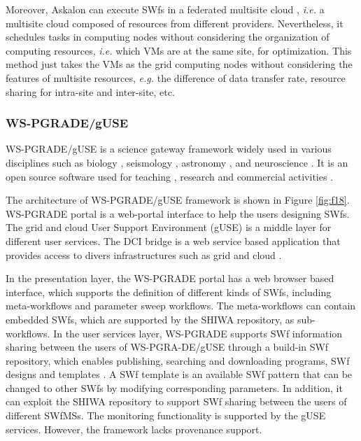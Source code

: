 Moreover, Askalon can execute SWfs in a federated multisite cloud \cite{Ostermann2009a}, \textit{i.e.} a multisite cloud composed of resources from different providers.
Nevertheless, it schedules tasks in computing nodes 
without considering the organization of computing resources,
\textit{i.e.} which VMs are at the same site, for optimization. 
This method just takes the VMs as the grid computing nodes without considering the features of multisite resources, \textit{e.g.}
the difference of data transfer rate, resource sharing for intra-site and inter-site, etc.

\subsubsection{WS-PGRADE/gUSE}

WS-PGRADE/gUSE is a science gateway framework widely used in various
disciplines such as biology \cite{Gesing2014}, seismology
\cite{Kocair2014}, astronomy \cite{Sciacca2014}, and neuroscience
\cite{Shahand2014}. It is an open source software
\cite{Kacsuk2012} used for teaching \cite{Olabarriaga2014}, research
\cite{Kiss2014} and commercial activities \cite{Kiss2014a}.


The architecture of WS-PGRADE/gUSE framework is shown in Figure
\ref{fig:f18}. WS-PGRADE portal is a web-portal interface to help
the users designing SWfs. The grid and cloud
User Support Environment (gUSE) is a middle layer for different user
services. The DCI bridge is a web service based application that provides
access to divers infrastructures such as grid and cloud
\cite{Kacsuk2012}.

In the presentation layer, the WS-PGRADE
portal \cite{Kacsuk2011} has a web browser based interface, which
supports the definition of different kinds of SWfs,
including meta-workflows and parameter sweep workflows. The
meta-workflows can contain embedded SWfs, which are supported by the
SHIWA repository, as sub-workflows. In the user services layer,
WS-PGRADE supports SWf information sharing between the users of
WS-PGRA-DE/gUSE through a build-in SWf repository, which enables
publishing, searching and downloading programs, SWf designs and
templates \cite{Balasko2014}. A SWf template is an available
SWf pattern that can be changed to other SWfs by modifying
corresponding parameters. In addition, it can exploit the SHIWA repository
\cite{Plankensteiner2013} to support SWf sharing between the
users of different SWfMSs. The monitoring functionality is supported
by the gUSE services. However, the framework lacks provenance
support.


